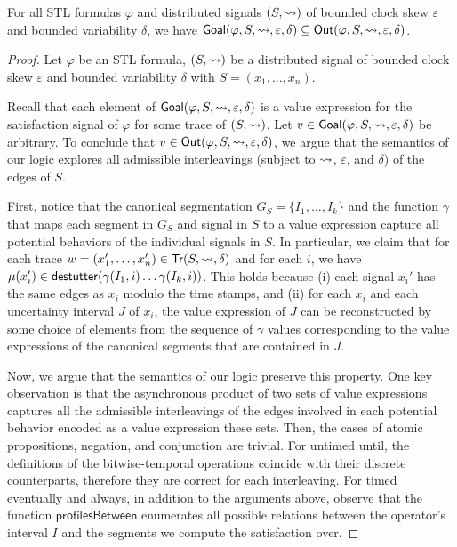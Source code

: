 \begin{theorem}
	For all STL formulas $\varphi$ and distributed signals $(S, {\rightsquigarrow})$ of bounded clock skew $\varepsilon$ and bounded variability $\delta$, we have $\mathsf{Goal}(\varphi, S, {\rightsquigarrow}, \varepsilon, \delta) \subseteq \mathsf{Out}(\varphi, S, {\rightsquigarrow}, \varepsilon, \delta)$.
\end{theorem}
\begin{proof}
	Let $\varphi$ be an STL formula, $(S, {\rightsquigarrow})$ be a distributed signal of bounded clock skew $\varepsilon$ and bounded variability $\delta$ with $S = (x_1, \ldots, x_n)$.
	
	Recall that each element of $\mathsf{Goal}(\varphi, S, {\rightsquigarrow}, \varepsilon, \delta)$ is a value expression for the satisfaction signal of $\varphi$ for some trace of $(S,{\rightsquigarrow})$.
	Let $v \in \mathsf{Goal}(\varphi, S, {\rightsquigarrow}, \varepsilon, \delta)$ be arbitrary.
	To conclude that $v \in \mathsf{Out}(\varphi, S, {\rightsquigarrow}, \varepsilon, \delta)$, we argue that the semantics of our logic explores all admissible interleavings (subject to ${\rightsquigarrow}$, $\varepsilon$, and $\delta$) of the edges of $S$.
	
	First, notice that the canonical segmentation $G_S = \{ I_1, \ldots, I_k \}$ and the function $\gamma$ that maps each segment in $G_S$ and signal in $S$ to a value expression capture all potential behaviors of the individual signals in $S$.
	In particular, we claim that for each trace $w = (x_1', \ldots, x_n') \in \mathsf{Tr}(S, {\rightsquigarrow}, \delta)$ and for each $i$, we have $\mu(x_i') \in \mathsf{destutter}(\gamma(I_1, i) \ldots \gamma(I_k, i))$.
	This holds because (i) each signal $x_i'$ has the same edges as $x_i$ modulo the time stamps, and (ii) for each $x_i$ and each uncertainty interval $J$ of $x_i$, the value expression of $J$ can be reconstructed by some choice of elements from the sequence of $\gamma$ values corresponding to the value expressions of the canonical segments that are contained in $J$.
	
	Now, we argue that the semantics of our logic preserve this property.
	One key observation is that the asynchronous product of two sets of value expressions captures all the admissible interleavings of the edges involved in each potential behavior encoded as a value expression these sets.
	Then, the cases of atomic propositions, negation, and conjunction are trivial.
	For untimed until, the definitions of the bitwise-temporal operations coincide with their discrete counterparts, therefore they are correct for each interleaving.
	For timed eventually and always, in addition to the arguments above, observe that the function $\mathsf{profilesBetween}$ enumerates all possible relations between the operator's interval $I$ and the segments we compute the satisfaction over.
	

\end{proof}
